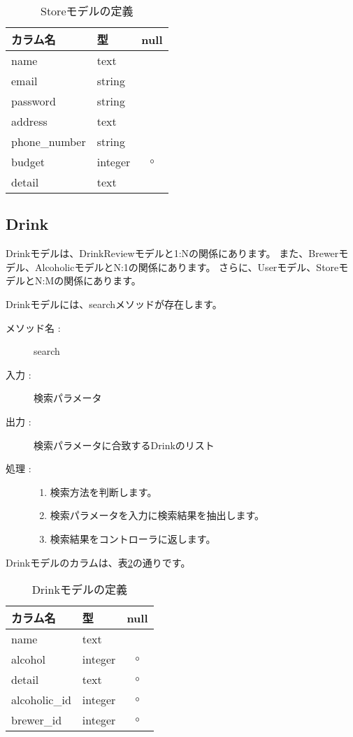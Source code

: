 \documentclass[a4j,titlepage]{jarticle}
\begin{document}
\begin{table}[!htbp]
\caption{Storeモデルの定義}
\label{store}
\small
\begin{center}
\begin{tabular}{|l|l|c|}\hline
カラム名 & 型 & null \\\hline\hline
name & text & \\\hline
email & string & \\\hline
password & string & \\\hline
address & text & \\\hline
phone\_number & string & \\\hline
budget & integer & $\circ$ \\\hline
detail & text & \\\hline
\end{tabular}
\end{center}
\end{table}

\subsection{Drink}
Drinkモデルは、DrinkReviewモデルと1:Nの関係にあります。
また、Brewerモデル、AlcoholicモデルとN:1の関係にあります。
さらに、Userモデル、StoreモデルとN:Mの関係にあります。

Drinkモデルには、searchメソッドが存在します。

\begin{description}
\item [メソッド名 :] search
\item [入力 :] 検索パラメータ
\item [出力 :] 検索パラメータに合致するDrinkのリスト
\item [処理 :]\mbox{}
  \begin{enumerate}
  \item 検索方法を判断します。
  \item 検索パラメータを入力に検索結果を抽出します。
  \item 検索結果をコントローラに返します。
  \end{enumerate}
\end{description}

Drinkモデルのカラムは、表\ref{drink}の通りです。

\begin{table}[!htbp]
\caption{Drinkモデルの定義}
\label{drink}
\small
\begin{center}
\begin{tabular}{|l|l|c|}\hline
カラム名 & 型 & null \\\hline\hline
name & text & \\\hline
alcohol & integer & $\circ$ \\\hline
detail & text & $\circ$ \\\hline
alcoholic\_id & integer & $\circ$ \\\hline
brewer\_id & integer & $\circ$ \\\hline
\end{tabular}
\end{center}
\end{table}
\end{document}

